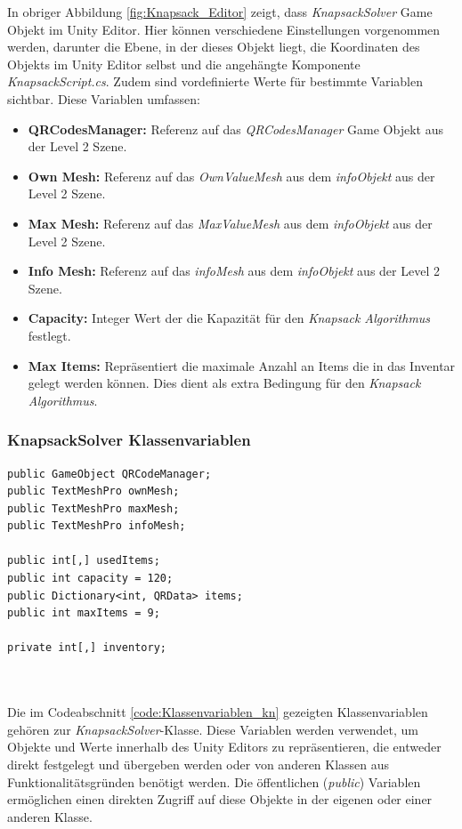 In obriger Abbildung \ref{fig:Knapsack_Editor} zeigt, dass \textit{KnapsackSolver} Game Objekt im Unity Editor. Hier können verschiedene
Einstellungen vorgenommen werden, darunter die Ebene, in der dieses Objekt liegt, die Koordinaten des Objekts im
Unity Editor selbst und die angehängte Komponente \textit{KnapsackScript.cs}. Zudem sind vordefinierte Werte für
bestimmte Variablen sichtbar. Diese Variablen umfassen:

\begin{itemize}
\item \textbf{QRCodesManager:} Referenz auf das \textit{QRCodesManager} Game Objekt aus der Level 2 Szene.
\item \textbf{Own Mesh:} Referenz auf das \textit{OwnValueMesh} aus dem \textit{infoObjekt} aus der Level 2 Szene.
\item \textbf{Max Mesh:} Referenz auf das \textit{MaxValueMesh} aus dem \textit{infoObjekt} aus der Level 2 Szene.
\item \textbf{Info Mesh:} Referenz auf das \textit{infoMesh} aus dem \textit{infoObjekt} aus der Level 2 Szene.
\item \textbf{Capacity:} Integer Wert der die Kapazität für den \textit{Knapsack Algorithmus} festlegt.
\item \textbf{Max Items:} Repräsentiert die maximale Anzahl an Items die in das Inventar gelegt werden können. Dies
dient als extra Bedingung für den \textit{Knapsack Algorithmus}.\\
\end{itemize}

\subsubsection{KnapsackSolver Klassenvariablen}
\begin{lstlisting}[style=csharp, caption={Klassenvariablen des KnapsackSolvers}, label=code:Klassenvariablen_kn]
public GameObject QRCodeManager;
public TextMeshPro ownMesh;
public TextMeshPro maxMesh;
public TextMeshPro infoMesh;

public int[,] usedItems;
public int capacity = 120;
public Dictionary<int, QRData> items;
public int maxItems = 9;

private int[,] inventory;
\end{lstlisting}\\
\\
Die im Codeabschnitt \ref{code:Klassenvariablen_kn} gezeigten Klassenvariablen gehören zur \textit{KnapsackSolver}-Klasse.
Diese Variablen werden verwendet, um Objekte und Werte innerhalb des Unity Editors zu repräsentieren, die entweder direkt
festgelegt und übergeben werden oder von anderen Klassen aus Funktionalitätsgründen benötigt werden. Die öffentlichen
(\textit{public}) Variablen ermöglichen einen direkten Zugriff auf diese Objekte in der eigenen oder einer anderen Klasse.


